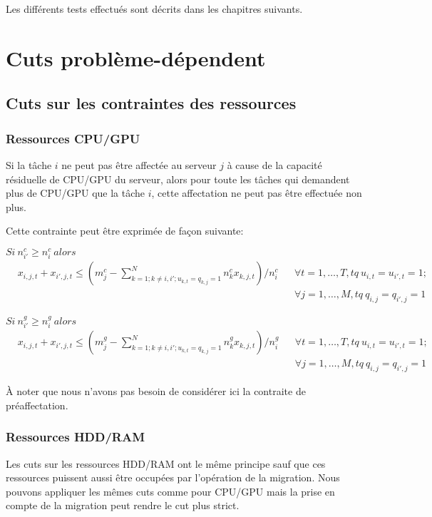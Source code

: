 \documentclass[twoside,fleqn]{EPURapport}
\begin{document}
Les différents tests effectués sont décrits dans les chapitres suivants.

\section{Cuts problème-dépendent}
\subsection{Cuts sur les contraintes des ressources}\label{cut1}
\subsubsection{Ressources CPU/GPU}
Si la tâche $i$ ne peut pas être affectée au serveur $j$ à cause de la capacité résiduelle de CPU/GPU du serveur, alors pour toute les tâches qui demandent plus de CPU/GPU que la tâche $i$, cette affectation ne peut pas être effectuée non plus.


Cette contrainte peut être exprimée de façon suivante:
\bigskip

$Si \  n^c_{i\prime}\geq n^c_{i}\ alors\;$
\begin{align} 
&x_{i,j,t}+x_{i\prime,j,t}\leq (m^c_j-\sum^N_{k=1; k\neq{i},i\prime;u_{k,t}=q_{k,j}=1}{n^c_kx_{k,j,t}})/n^c_i
&&\forall t=1,\ldots,T, tq\ u_{i,t}=u_{i\prime,t}=1; \nonumber \\
 & &&\forall j=1, \ldots, M, tq\ q_{i,j}=q_{i\prime,j}=1
\end{align} 
 
$Si\ n^g_{i\prime}\geq n^g_{i}\ alors\;$
\begin{align} 
&x_{i,j,t}+x_{i\prime,j,t}\leq (m^g_j-\sum^N_{k=1; k\neq{i},i\prime;u_{k,t}=q_{k,j}=1}{n^g_kx_{k,j,t}})/n^g_i 
&&\forall t=1,\ldots,T, tq\ u_{i,t}=u_{i\prime,t}=1; \nonumber \\
 & &&\forall j=1, \ldots, M, tq\ q_{i,j}=q_{i\prime,j}=1
\end{align} 


À noter que nous n'avons pas besoin de considérer ici la contraite de préaffectation.

\subsubsection{Ressources HDD/RAM}
Les cuts sur les ressources HDD/RAM ont le même principe sauf que ces ressources puissent aussi être occupées par l'opération de la migration. Nous pouvons appliquer les mêmes cuts comme pour CPU/GPU mais la prise en compte de la migration peut rendre le cut plus strict.
\bigskip
\end{document}
